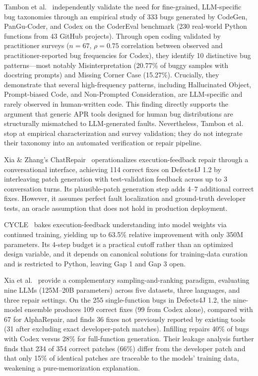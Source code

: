 \documentclass[10pt,a4paper]{article}
\begin{document}
Tambon et al.~\cite{tambon2025} independently validate the need for fine-grained, LLM-specific bug taxonomies through an empirical study of 333 bugs generated by CodeGen, PanGu-Coder, and Codex on the CoderEval benchmark (230 real-world Python functions from 43 GitHub projects). Through open coding validated by practitioner surveys ($n=67$, $\rho=0.75$ correlation between observed and practitioner-reported bug frequencies for Codex), they identify 10 distinctive bug patterns---most notably Misinterpretation (20.77\% of buggy samples with docstring prompts) and Missing Corner Case (15.27\%). Crucially, they demonstrate that several high-frequency patterns, including Hallucinated Object, Prompt-biased Code, and Non-Prompted Consideration, are LLM-specific and rarely observed in human-written code. This finding directly supports the argument that generic APR tools designed for human bug distributions are structurally mismatched to LLM-generated faults. Nevertheless, Tambon et al. stop at empirical characterization and survey validation; they do not integrate their taxonomy into an automated verification or repair pipeline.

Xia \& Zhang's ChatRepair~\cite{xia2024chatrepair} operationalizes execution-feedback repair through a conversational interface, achieving 114 correct fixes on Defects4J 1.2 by interleaving patch generation with test-validation feedback across up to 3 conversation turns. Its plausible-patch generation step adds 4--7 additional correct fixes. However, it assumes perfect fault localization and ground-truth developer tests, an oracle assumption that does not hold in production deployment.

CYCLE~\cite{ding2024cycle} bakes execution-feedback understanding into model weights via continued training, yielding up to 63.5\% relative improvement with only 350M parameters. Its 4-step budget is a practical cutoff rather than an optimized design variable, and it depends on canonical solutions for training-data curation and is restricted to Python, leaving Gap 1 and Gap 3 open.

Xia et al.~\cite{xia2023apr} provide a complementary sampling-and-ranking paradigm, evaluating nine LLMs (125M--20B parameters) across five datasets, three languages, and three repair settings. On the 255 single-function bugs in Defects4J 1.2, the nine-model ensemble produces 109 correct fixes (99 from Codex alone), compared with 67 for AlphaRepair, and finds 36 fixes not previously reported by existing tools (31 after excluding exact developer-patch matches). Infilling repairs 40\% of bugs with Codex versus 28\% for full-function generation. Their leakage analysis further finds that 234 of 354 correct patches (66\%) differ from the developer patch and that only 15\% of identical patches are traceable to the models' training data, weakening a pure-memorization explanation.
\end{document}
